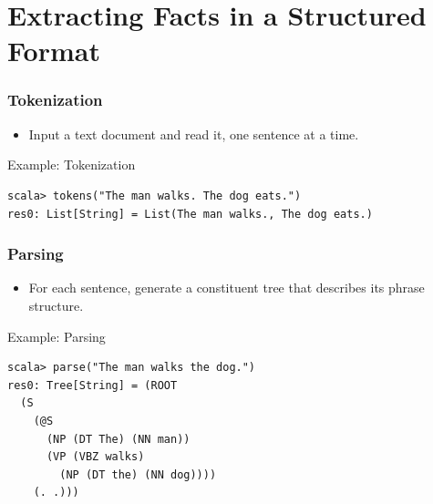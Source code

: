\documentclass[mathserif]{beamer}
\begin{document}
\section{Extracting Facts in a Structured Format}

\begin{frame}

\frametitle{Tokenization}

\begin{itemize}[<+->]

\item Input a text document and read it, one sentence at a time.

\end{itemize}

\end{frame}

\begin{frame}[fragile]


\begin{block}{Example: Tokenization}
\begin{lstlisting}
scala> tokens("The man walks. The dog eats.")
res0: List[String] = List(The man walks., The dog eats.)
\end{lstlisting}
\end{block}

\end{frame}

\begin{frame}

\frametitle{Parsing}

\begin{itemize}[<+->]

\item For each sentence, generate a constituent tree that describes its phrase structure.

\end{itemize}

\end{frame}

\begin{frame}[fragile]

\begin{block}{Example: Parsing}
\begin{lstlisting}
scala> parse("The man walks the dog.")
res0: Tree[String] = (ROOT
  (S
    (@S
      (NP (DT The) (NN man))
      (VP (VBZ walks)
        (NP (DT the) (NN dog))))
    (. .)))
\end{lstlisting}
\end{block}

\end{frame}
\end{document}
